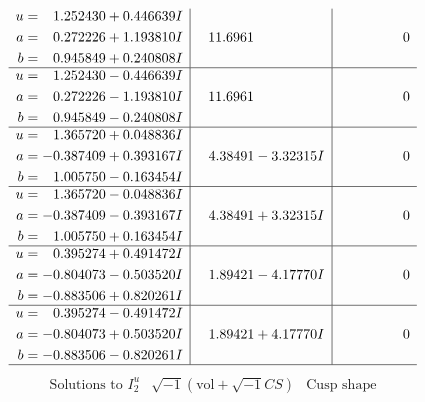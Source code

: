 \documentclass[1p]{elsarticle_modified}
\theoremstyle{definition}
\newcommand{\I}{\sqrt{-1}}
\begin{document}
$$\begin{array}{c|c|c}
\begin{aligned}
u &= \phantom{-}1.252430 + 0.446639 I \\
a &= \phantom{-}0.272226 + 1.193810 I \\
b &= \phantom{-}0.945849 + 0.240808 I\end{aligned}
 & \phantom{-}11.6961\phantom{ +0.000000I} & \phantom{-0.000000 } 0 \\ \hline\begin{aligned}
u &= \phantom{-}1.252430 - 0.446639 I \\
a &= \phantom{-}0.272226 - 1.193810 I \\
b &= \phantom{-}0.945849 - 0.240808 I\end{aligned}
 & \phantom{-}11.6961\phantom{ +0.000000I} & \phantom{-0.000000 } 0 \\ \hline\begin{aligned}
u &= \phantom{-}1.365720 + 0.048836 I \\
a &= -0.387409 + 0.393167 I \\
b &= \phantom{-}1.005750 - 0.163454 I\end{aligned}
 & \phantom{-}4.38491 - 3.32315 I & \phantom{-0.000000 } 0 \\ \hline\begin{aligned}
u &= \phantom{-}1.365720 - 0.048836 I \\
a &= -0.387409 - 0.393167 I \\
b &= \phantom{-}1.005750 + 0.163454 I\end{aligned}
 & \phantom{-}4.38491 + 3.32315 I & \phantom{-0.000000 } 0 \\ \hline\begin{aligned}
u &= \phantom{-}0.395274 + 0.491472 I \\
a &= -0.804073 - 0.503520 I \\
b &= -0.883506 + 0.820261 I\end{aligned}
 & \phantom{-}1.89421 - 4.17770 I & \phantom{-0.000000 } 0 \\ \hline\begin{aligned}
u &= \phantom{-}0.395274 - 0.491472 I \\
a &= -0.804073 + 0.503520 I \\
b &= -0.883506 - 0.820261 I\end{aligned}
 & \phantom{-}1.89421 + 4.17770 I & \phantom{-0.000000 } 0\\
 \hline 
 \end{array}$$\newpage$$\begin{array}{c|c|c}  
\text{Solutions to }I^u_{2}& \I (\text{vol} + \sqrt{-1}CS) & \text{Cusp shape}\\

\end{array}$$
\end{document}

